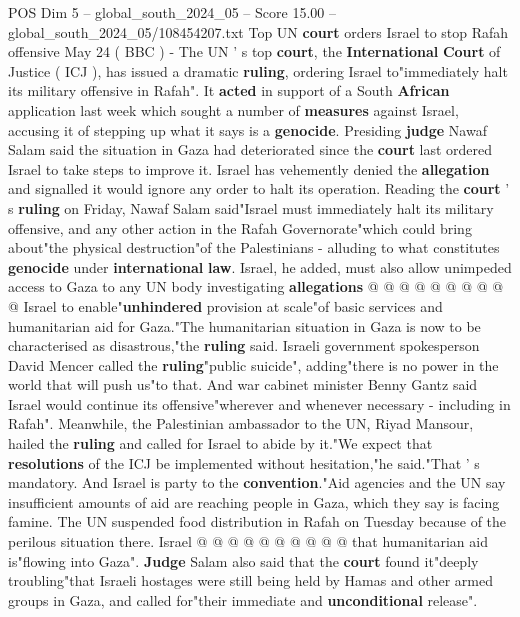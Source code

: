 \begin{textsample}{POS Dim 5 – global\_south\_2024\_05 – Score 15.00 – global\_south\_2024\_05/108454207.txt}  \label{ex:f5_pos_078}
Top UN \textbf{court} orders Israel to stop Rafah offensive May 24 ( BBC ) - The UN ' s top \textbf{court}, the \textbf{International} \textbf{Court} of Justice ( ICJ ), has issued a dramatic \textbf{ruling}, ordering Israel to"immediately halt its military offensive in Rafah".
It \textbf{acted} in support of a South \textbf{African} application last week which sought a number of \textbf{measures} against Israel, accusing it of stepping up what it says is a \textbf{genocide}.
Presiding \textbf{judge} Nawaf Salam said the situation in Gaza had deteriorated since the \textbf{court} last ordered Israel to take steps to improve it.
Israel has vehemently denied the \textbf{allegation} and signalled it would ignore any order to halt its operation.
Reading the \textbf{court} ' s \textbf{ruling} on Friday, Nawaf Salam said"Israel must immediately halt its military offensive, and any other action in the Rafah Governorate"which could bring about"the physical destruction"of the Palestinians - alluding to what constitutes \textbf{genocide} under \textbf{international} \textbf{law}.
Israel, he added, must also allow unimpeded access to Gaza to any UN body investigating \textbf{allegations} @ @ @ @ @ @ @ @ @ @ Israel to enable"\textbf{unhindered} provision at scale"of basic services and humanitarian aid for Gaza."The humanitarian situation in Gaza is now to be characterised as disastrous,"the \textbf{ruling} said.
Israeli government spokesperson David Mencer called the \textbf{ruling}"public suicide", adding"there is no power in the world that will push us"to that.
And war cabinet minister Benny Gantz said Israel would continue its offensive"wherever and whenever necessary - including in Rafah".
Meanwhile, the Palestinian ambassador to the UN, Riyad Mansour, hailed the \textbf{ruling} and called for Israel to abide by it."We expect that \textbf{resolutions} of the ICJ be implemented without hesitation,"he said."That ' s mandatory.
And Israel is party to the \textbf{convention}."Aid agencies and the UN say insufficient amounts of aid are reaching people in Gaza, which they say is facing famine.
The UN suspended food distribution in Rafah on Tuesday because of the perilous situation there.
Israel @ @ @ @ @ @ @ @ @ @ that humanitarian aid is"flowing into Gaza". \textbf{Judge} Salam also said that the \textbf{court} found it"deeply troubling"that Israeli hostages were still being held by Hamas and other armed groups in Gaza, and called for"their immediate and \textbf{unconditional} release".

\end{textsample}

